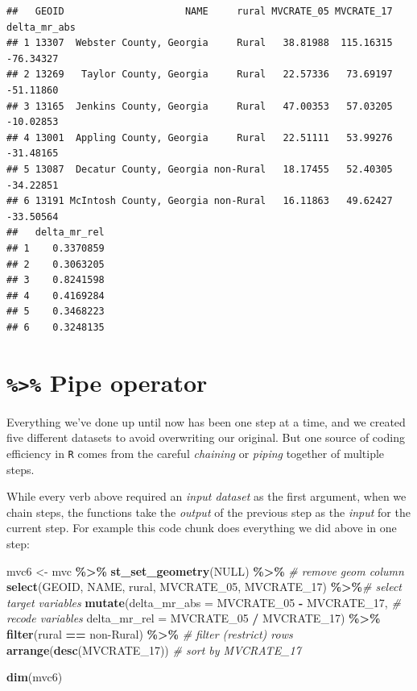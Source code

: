 \documentclass[
]{book}
\newenvironment{Shaded}{\begin{snugshade}}{\end{snugshade}}
\newcommand{\AttributeTok}[1]{\textcolor[rgb]{0.13,0.29,0.53}{#1}}
\newcommand{\CommentTok}[1]{\textcolor[rgb]{0.56,0.35,0.01}{\textit{#1}}}
\newcommand{\ConstantTok}[1]{\textcolor[rgb]{0.56,0.35,0.01}{#1}}
\newcommand{\FunctionTok}[1]{\textcolor[rgb]{0.13,0.29,0.53}{\textbf{#1}}}
\newcommand{\NormalTok}[1]{#1}
\newcommand{\OtherTok}[1]{\textcolor[rgb]{0.56,0.35,0.01}{#1}}
\newcommand{\SpecialCharTok}[1]{\textcolor[rgb]{0.81,0.36,0.00}{\textbf{#1}}}
\newcommand{\StringTok}[1]{\textcolor[rgb]{0.31,0.60,0.02}{#1}}
\begin{document}
\begin{verbatim}
##   GEOID                     NAME     rural MVCRATE_05 MVCRATE_17 delta_mr_abs
## 1 13307  Webster County, Georgia     Rural   38.81988  115.16315    -76.34327
## 2 13269   Taylor County, Georgia     Rural   22.57336   73.69197    -51.11860
## 3 13165  Jenkins County, Georgia     Rural   47.00353   57.03205    -10.02853
## 4 13001  Appling County, Georgia     Rural   22.51111   53.99276    -31.48165
## 5 13087  Decatur County, Georgia non-Rural   18.17455   52.40305    -34.22851
## 6 13191 McIntosh County, Georgia non-Rural   16.11863   49.62427    -33.50564
##   delta_mr_rel
## 1    0.3370859
## 2    0.3063205
## 3    0.8241598
## 4    0.4169284
## 5    0.3468223
## 6    0.3248135
\end{verbatim}

\hypertarget{pipe-operator}{%
\section{\texorpdfstring{\texttt{\%\textgreater{}\%} Pipe operator}{\%\textgreater\% Pipe operator}}\label{pipe-operator}}

Everything we've done up until now has been one step at a time, and we created five different datasets to avoid overwriting our original. But one source of coding efficiency in \texttt{R} comes from the careful \emph{chaining} or \emph{piping} together of multiple steps.

While every verb above required an \emph{input dataset} as the first argument, when we chain steps, the functions take the \emph{output} of the previous step as the \emph{input} for the current step. For example this code chunk does everything we did above in one step:

\begin{Shaded}
\begin{Highlighting}[]
\NormalTok{mvc6 }\OtherTok{\textless{}{-}}\NormalTok{ mvc }\SpecialCharTok{\%\textgreater{}\%}
  \FunctionTok{st\_set\_geometry}\NormalTok{(}\ConstantTok{NULL}\NormalTok{) }\SpecialCharTok{\%\textgreater{}\%}                             \CommentTok{\# remove geom column}
  \FunctionTok{select}\NormalTok{(GEOID, NAME, rural, MVCRATE\_05, MVCRATE\_17) }\SpecialCharTok{\%\textgreater{}\%}\CommentTok{\# select target variables}
  \FunctionTok{mutate}\NormalTok{(}\AttributeTok{delta\_mr\_abs =}\NormalTok{ MVCRATE\_05 }\SpecialCharTok{{-}}\NormalTok{ MVCRATE\_17,        }\CommentTok{\# recode variables}
        \AttributeTok{delta\_mr\_rel =}\NormalTok{ MVCRATE\_05 }\SpecialCharTok{/}\NormalTok{ MVCRATE\_17) }\SpecialCharTok{\%\textgreater{}\%}
  \FunctionTok{filter}\NormalTok{(rural }\SpecialCharTok{==} \StringTok{\textquotesingle{}non{-}Rural\textquotesingle{}}\NormalTok{) }\SpecialCharTok{\%\textgreater{}\%}                      \CommentTok{\# filter (restrict) rows}
  \FunctionTok{arrange}\NormalTok{(}\FunctionTok{desc}\NormalTok{(MVCRATE\_17))                             }\CommentTok{\# sort by MVCRATE\_17}

\FunctionTok{dim}\NormalTok{(mvc6)}
\end{Highlighting}
\end{Shaded}
\end{document}
